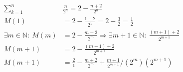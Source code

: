 
\begin{align}
	\sum_{k = 1}^{n}& \frac{n}{2^n} = 2 - \frac{n + 2}{2^n} \\
	M(1) &= 2 - \frac{1 + 2}{2^1} = 2 - \frac{3}{2} = \frac{1}{2} \\
	\exists m \in \mathbb{N}:\ M(m) &= 2 - \frac{m + 2}{2^m} \Rightarrow \exists m + 1 \in \mathbb{N}:\ \frac{(m + 1) + 2}{2^{m + 1}} \\
	M(m + 1) &= 2 - \frac{(m + 1) + 2}{2^{m + 1}} \\
	M(m + 1) &= \frac{2}{1} - \frac{m + 2}{2^m} + \frac{m + 1}{2^{m + 1}} \slash (2^m)(2^{m + 1}) \\
\end{align}
